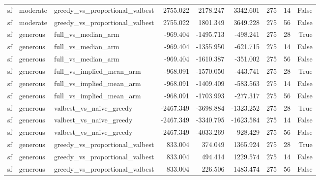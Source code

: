 \begin{tabular}{lllrrrrrr}
sf & moderate & greedy\_vs\_proportional\_valbest & 2755.022 & 2178.247 & 3342.601 & 275 & 14 & False \\
sf & moderate & greedy\_vs\_proportional\_valbest & 2755.022 & 1801.349 & 3649.228 & 275 & 56 & False \\
sf & generous & full\_vs\_median\_arm & -969.404 & -1495.713 & -498.241 & 275 & 28 & True \\
sf & generous & full\_vs\_median\_arm & -969.404 & -1355.950 & -621.715 & 275 & 14 & False \\
sf & generous & full\_vs\_median\_arm & -969.404 & -1610.387 & -351.002 & 275 & 56 & False \\
sf & generous & full\_vs\_implied\_mean\_arm & -968.091 & -1570.050 & -443.741 & 275 & 28 & True \\
sf & generous & full\_vs\_implied\_mean\_arm & -968.091 & -1409.409 & -583.563 & 275 & 14 & False \\
sf & generous & full\_vs\_implied\_mean\_arm & -968.091 & -1703.993 & -277.317 & 275 & 56 & False \\
sf & generous & valbest\_vs\_naive\_greedy & -2467.349 & -3698.884 & -1323.252 & 275 & 28 & True \\
sf & generous & valbest\_vs\_naive\_greedy & -2467.349 & -3340.795 & -1623.584 & 275 & 14 & False \\
sf & generous & valbest\_vs\_naive\_greedy & -2467.349 & -4033.269 & -928.429 & 275 & 56 & False \\
sf & generous & greedy\_vs\_proportional\_valbest & 833.004 & 374.049 & 1365.924 & 275 & 28 & True \\
sf & generous & greedy\_vs\_proportional\_valbest & 833.004 & 494.414 & 1229.574 & 275 & 14 & False \\
sf & generous & greedy\_vs\_proportional\_valbest & 833.004 & 226.506 & 1483.474 & 275 & 56 & False \\
\bottomrule
\end{tabular}
